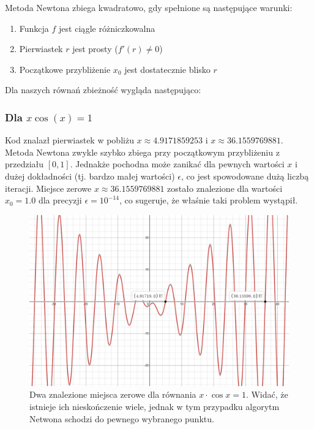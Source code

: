 \documentclass[a4paper,12pt]{article}
\begin{document}
Metoda Newtona zbiega kwadratowo, gdy spełnione są następujące warunki:
\begin{enumerate}
    \item Funkcja $f$ jest ciągle różniczkowalna
    \item Pierwiastek $r$ jest prosty ($f'(r) \neq 0$)
    \item Początkowe przybliżenie $x_0$ jest dostatecznie blisko $r$
\end{enumerate}

Dla naszych równań zbieżność wygląda następująco:

\subsubsection{Dla $x \cos(x) = 1$}
Kod znalazł pierwiastek w pobliżu $x \approx 4.9171859253$ i  $x \approx 36.1559769881$. Metoda Newtona zwykle szybko zbiega przy początkowym przybliżeniu z przedziału $[0, 1]$. Jednakże pochodna może zanikać dla pewnych wartości $x$ i dużej dokładności (tj. bardzo małej wartości) $\epsilon$, co jest spowodowane dużą liczbą iteracji. Miejsce zerowe $x \approx 36.1559769881$ zostało znalezione dla wartości $x_0 = 1.0$ dla precyzji $\epsilon = 10^{-14}$, co sugeruje, że właśnie taki problem wystąpił.

\begin{figure}[H]
    \centering
    \includegraphics[width=1\linewidth]{found_points.PNG}
    \caption{Dwa znalezione miejsca zerowe dla równania $x \cdot \cos x = 1$. Widać, że istnieje ich nieskończenie wiele, jednak w tym przypadku algorytm Netwona schodzi do pewnego wybranego punktu.}
    \label{fig:first-solutions}
\end{figure}
\end{document}
